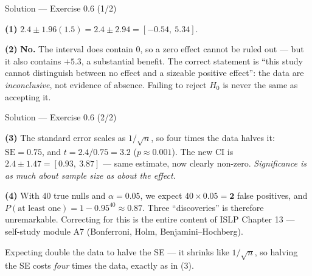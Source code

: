 \documentclass[aspectratio=169,11pt]{beamer}
\begin{document}
\begin{frame}{Solution --- Exercise 0.6 (1/2)}
  \begin{solutionbox}
    \textbf{(1)} $2.4 \pm 1.96(1.5) = 2.4 \pm 2.94 = [-0.54,\ 5.34]$.

    \textbf{(2)} \textbf{No.} The interval does contain $0$, so a zero effect
    cannot be ruled out --- but it also contains $+5.3$, a substantial
    benefit. The correct statement is ``this study cannot distinguish between
    no effect and a sizeable positive effect'': the data are
    \emph{inconclusive}, not evidence of absence. Failing to reject $H_0$ is
    never the same as accepting it.
  \end{solutionbox}
\end{frame}

\begin{frame}{Solution --- Exercise 0.6 (2/2)}
  \begin{solutionbox}
    \textbf{(3)} The standard error scales as $1/\sqrt{n}$, so four times the
    data halves it: $\mathrm{SE} = 0.75$, and $t = 2.4/0.75 = 3.2$
    ($p \approx 0.001$). The new CI is $2.4 \pm 1.47 = [0.93,\ 3.87]$ ---
    same estimate, now clearly non-zero. \emph{Significance is as much about
    sample size as about the effect.}

    \textbf{(4)} With $40$ true nulls and $\alpha = 0.05$, we expect
    $40 \times 0.05 = \textbf{2}$ false positives, and $P(\text{at least
    one}) = 1 - 0.95^{40} \approx 0.87$. Three ``discoveries'' is therefore
    unremarkable. Correcting for this is the entire content of ISLP Chapter 13
    --- self-study module A7 (Bonferroni, Holm, Benjamini--Hochberg).
  \end{solutionbox}
  \begin{mistake}
    Expecting double the data to halve the SE ---
    it shrinks like $1/\sqrt n$, so halving the SE costs \emph{four} times
    the data, exactly as in (3).
  \end{mistake}
\end{frame}
\end{document}
